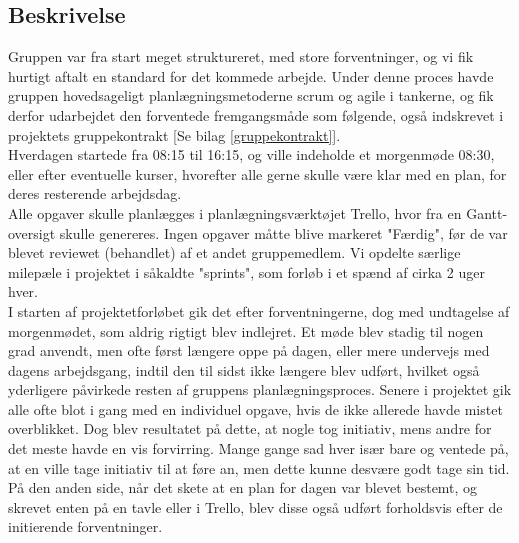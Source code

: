 \documentclass[11pt]{article}
\begin{document}
\subsection{Beskrivelse}
Gruppen var fra start meget struktureret, med store forventninger, og vi fik hurtigt aftalt en standard for det kommede arbejde. Under denne proces havde gruppen hovedsageligt planlægningsmetoderne scrum og agile i tankerne, og fik derfor udarbejdet den forventede fremgangsmåde som følgende, også indskrevet i projektets gruppekontrakt [Se bilag \ref{gruppekontrakt}].\\
Hverdagen startede fra 08:15 til 16:15, og ville indeholde et morgenmøde 08:30, eller efter eventuelle kurser, hvorefter alle gerne skulle være klar med en plan, for deres resterende arbejdsdag.\\
Alle opgaver skulle planlægges i planlægningsværktøjet Trello, hvor fra en Gantt-oversigt skulle genereres. Ingen opgaver måtte blive markeret "Færdig", før de var blevet reviewet (behandlet) af et andet gruppemedlem. Vi opdelte særlige milepæle i projektet i såkaldte "sprints", som forløb i et spænd af cirka 2 uger hver.\\
I starten af projektetforløbet gik det efter forventningerne, dog med undtagelse af morgenmødet, som aldrig rigtigt blev indlejret. Et møde blev stadig til nogen grad anvendt, men ofte først længere oppe på dagen, eller mere undervejs med dagens arbejdsgang, indtil den til sidst ikke længere blev udført, hvilket også yderligere påvirkede resten af gruppens planlægningsproces. Senere i projektet gik alle ofte blot i gang med en individuel opgave, hvis de ikke allerede havde mistet overblikket. Dog blev resultatet på dette, at nogle tog initiativ, mens andre for det meste havde en vis forvirring. Mange gange sad hver især bare og ventede på, at en ville tage initiativ til at føre an, men dette kunne desvære godt tage sin tid. På den anden side, når det skete at en plan for dagen var blevet bestemt, og skrevet enten på en tavle eller i Trello, blev disse også udført forholdsvis efter de initierende forventninger.
\end{document}
